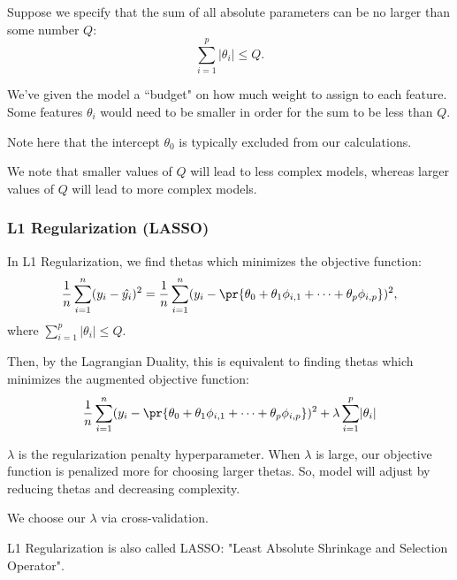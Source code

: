 \documentclass[openany]{book}
\begin{document}
\begin{example}
	Suppose we specify that the sum of all absolute parameters can be no larger than some number $Q$:
	\begin{equation*}
		\sum_{i=1}^{p} \lvert \theta_i \rvert \leq Q.
	\end{equation*}

	We've given the model a ``budget" on how much weight to assign to each feature. Some features $\theta_i$ would need to be smaller in order for the sum to be less than $Q$.
	
	Note here that the intercept $\theta_0$ is typically excluded from our calculations.
\end{example}

We note that smaller values of $Q$ will lead to less complex models, whereas larger values of $Q$ will lead to more complex models.

\subsubsection{L1 Regularization (LASSO)}
\begin{defn}[L1 Regularization]
	In L1 Regularization, we find thetas which minimizes the objective function:
	\begin{equation*}
		\dfrac{1}{n} \sum_{i=1}^{n} (y_i - \hat{y_i})^{2} = \dfrac{1}{n} \sum_{i=1}^{n} (y_i - \pr{\theta_0 + \theta_1\phi_{i,1} + \cdots + \theta_p\phi_{i,p}})^{2},
	\end{equation*}
	where $\sum_{i=1}^{p} \lvert \theta_i \rvert \leq Q$.
	
	Then, by the Lagrangian Duality, this is equivalent to finding thetas which minimizes the augmented objective function:
	\begin{equation*}
		\dfrac{1}{n} \sum_{i=1}^{n} (y_i - \pr{\theta_0 + \theta_1\phi_{i,1} + \cdots + \theta_p\phi_{i,p}})^{2} + \lambda\sum_{i=1}^{p} \lvert \theta_i \rvert
	\end{equation*}
\end{defn}
\begin{defn}
	$\lambda$ is the regularization penalty hyperparameter. When $\lambda$ is large, our objective function is penalized more for choosing larger thetas. So, model will adjust by reducing thetas and decreasing complexity.
\end{defn}

We choose our $\lambda$ via cross-validation.

\begin{rmk}
	L1 Regularization is also called LASSO: "Least Absolute Shrinkage and Selection Operator".
\end{rmk}
\end{document}

